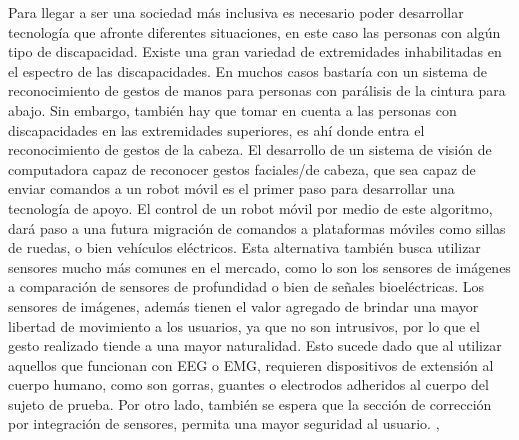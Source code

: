 Para llegar a ser una sociedad más inclusiva es necesario poder desarrollar tecnología que afronte diferentes situaciones, en este caso las personas con algún tipo de discapacidad. Existe una gran variedad de extremidades inhabilitadas en el espectro de las discapacidades. En muchos casos bastaría con un sistema de reconocimiento de gestos de manos para personas con parálisis de la cintura para abajo. Sin embargo, también hay que tomar en cuenta a las personas con discapacidades en las extremidades superiores, es ahí donde entra el reconocimiento de gestos de la cabeza. El desarrollo de un sistema de visión de computadora capaz de reconocer gestos faciales/de cabeza, que sea capaz de enviar comandos a un robot móvil es el primer paso para desarrollar una tecnología de apoyo. El control de un robot móvil por medio de este algoritmo, dará paso a una futura migración de comandos a plataformas móviles como sillas de ruedas, o bien vehículos eléctricos. Esta alternativa también busca utilizar sensores mucho más comunes en el mercado, como lo son los sensores de imágenes a comparación de sensores de profundidad o bien de señales bioeléctricas. Los sensores de imágenes, además tienen el valor agregado de brindar una mayor libertad de movimiento a los usuarios, ya que no son intrusivos, por lo que el gesto realizado tiende a una mayor naturalidad. Esto sucede dado que al utilizar aquellos que funcionan con EEG o EMG, requieren dispositivos de extensión al cuerpo humano, como son gorras, guantes o electrodos adheridos al cuerpo del sujeto de prueba. Por otro lado, también se espera que la sección de corrección por integración de sensores, permita una mayor seguridad al usuario. \cite{Wang_Jang_2018}, \cite{Bankar2015}





